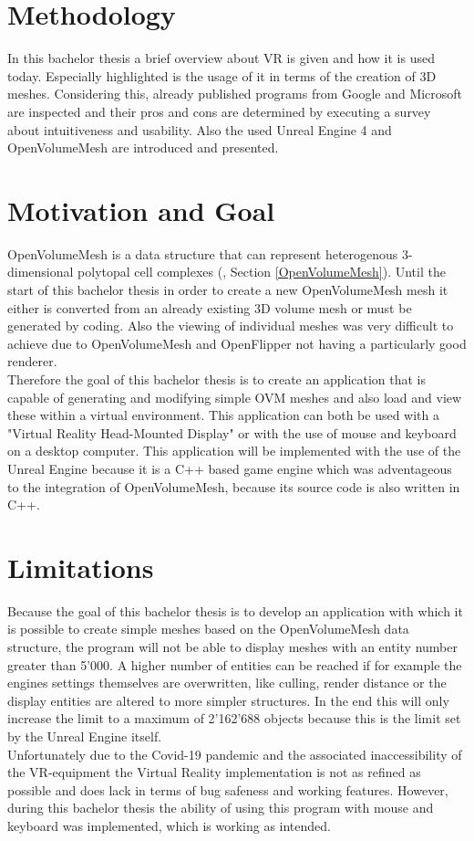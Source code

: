 \documentclass{report}
\begin{document}
	\section{Methodology}
	\startsection
		In this bachelor thesis a brief overview about VR is given and how it is used today. Especially highlighted is the usage of it in terms of the creation of 3D meshes. Considering this, already published programs from Google and Microsoft are inspected and their pros and cons are determined by executing a survey about intuitiveness and usability. Also the used Unreal Engine 4 and OpenVolumeMesh are introduced and presented.
	\closesection
	
	\section{Motivation and Goal}
	\startsection
		OpenVolumeMesh is a data structure that can represent heterogenous 3-dimensional polytopal cell complexes (\citep{KBK13}, Section \ref{OpenVolumeMesh}). Until the start of this bachelor thesis in order to create a new OpenVolumeMesh mesh it either is converted from an already existing 3D volume mesh or must be generated by coding. Also the viewing of individual meshes was very difficult to achieve due to OpenVolumeMesh and OpenFlipper not having a particularly good renderer. \\
		Therefore the goal of this bachelor thesis is to create an application that is capable of generating and modifying simple OVM meshes and also load and view these within a virtual environment. This application can both be used with a "Virtual Reality Head-Mounted Display" or with the use of mouse and keyboard on a desktop computer. This application will be implemented with the use of the Unreal Engine because it is a C++ based game engine which was adventageous to the integration of OpenVolumeMesh, because its source code is also written in C++. 
	\closesection
	
	\section{Limitations}
	\startsection
		Because the goal of this bachelor thesis is to develop an application with which it is possible to create simple meshes based on the OpenVolumeMesh data structure, the program will not be able to display meshes with an entity number greater than 5'000. A higher number of entities can be reached if for example the engines settings themselves are overwritten, like culling, render distance or the display entities are altered to more simpler structures. In the end this will only increase the limit to a maximum of 2'162'688 objects because this is the limit set by the Unreal Engine itself. \\
		Unfortunately due to the Covid-19 pandemic and the associated inaccessibility of the VR-equipment the Virtual Reality implementation is not as refined as possible and does lack in terms of bug safeness and working features. However, during this bachelor thesis the ability of using this program with mouse and keyboard was implemented, which is working as intended.
	\closesection
	
\end{document}
